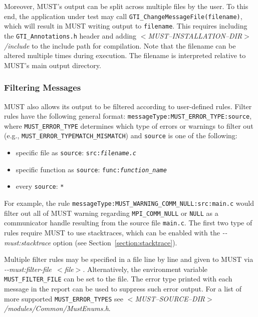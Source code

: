 \documentclass[english]{scrartcl}
\begin{document}
Moreover, MUST's output can be split across multiple files by the user.
To this end, the application under test may call \texttt{GTI\_ChangeMessageFile(filename)}, which will result in MUST writing output to \texttt{filename}.
This requires including the \texttt{GTI\_Annotations.h} header and adding \emph{$<$MUST\mbox{--}INSTALLATION\mbox{--}DIR$>$/include} to the include path for compilation.
Note that the filename can be altered multiple times during execution.
The filename is interpreted relative to MUST's main output directory.

\subsubsection{Filtering Messages}
MUST also allows its output to be filtered according to user-defined rules.
Filter rules have the following general format: \texttt{messageType:MUST\_ERROR\_TYPE:source}, where \texttt{MUST\_ERROR\_TYPE} determines which type of errors or warnings to filter out (e.g., \texttt{MUST\_ERROR\_TYPEMATCH\_MISMATCH}) and \texttt{source} is one of the following:

\begin{itemize}
    \item specific file as \texttt{source}: \texttt{src:\textit{filename.c}}
    \item specific function as \texttt{source}: \texttt{func:\textit{function\_name}}
    \item every \texttt{source}: \texttt{*}
\end{itemize}

For example, the rule \texttt{messageType:MUST\_WARNING\_COMM\_NULL:src:main.c} would filter out all of MUST warning regarding \texttt{MPI\_COMM\_NULL} or \texttt{NULL} as a communicator handle resulting from the source file \texttt{main.c}.
The first two type of rules require MUST to use stacktraces, which can be enabled with the \mbox{\emph{\mbox{-{}-must:stacktrace}}} option (see Section~\ref{section:stacktrace}).

Multiple filter rules may be specified in a file line by line and given to MUST via \mbox{\emph{\mbox{-{}-must:filter-file $<$file$>$}}}.
Alternatively, the environment variable \texttt{MUST\_FILTER\_FILE} can be set to the file.
The error type printed with each message in the report can be used to suppress such error output.
For a list of more supported \texttt{MUST\_ERROR\_TYPES} see \emph{$<$MUST\mbox{--}SOURCE\mbox{--}DIR$>$/modules/Common/MustEnums.h}.
\end{document}

